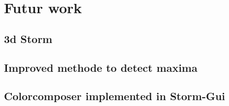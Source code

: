 \chapter{Futur work}
\section{3d Storm}
\section{Improved methode to detect maxima}
\section{Colorcomposer implemented in Storm-Gui}
